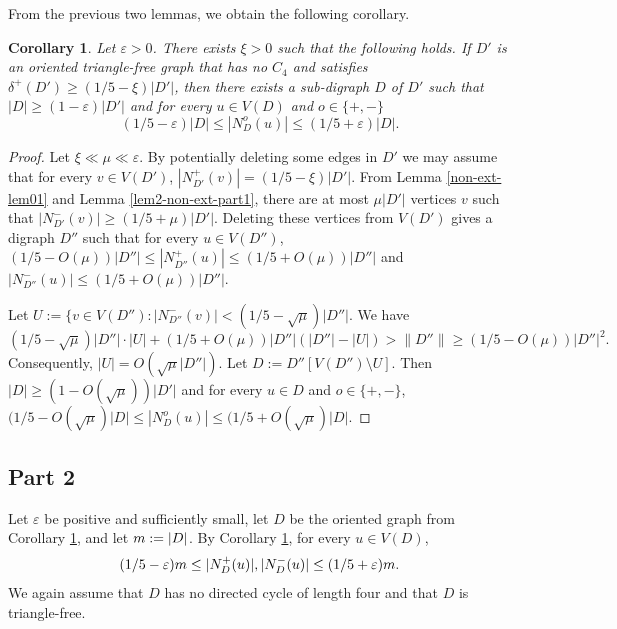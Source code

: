 \documentclass{article}
\newtheorem{cor}[theorem]{Corollary}
\renewcommand{\epsilon}{{\varepsilon}}
\DeclarePairedDelimiter{\abs}{\lvert}{\rvert}
\begin{document}
From the previous two lemmas, we obtain the following corollary.
\begin{cor}\label{cor-NE-part1}
    Let $\epsilon>0$. There exists $\xi>0$ such that the following holds. If $D'$ is an oriented triangle-free graph that has no $C_4$ and satisfies $\delta^+(D') \geq (1/5-\xi)|D'|$, then there exists a sub-digraph $D$ of $D'$ such that $|D|\geq (1-\epsilon) |D'|$ and  for every $u\in V(D)$ and $o\in \{+,-\}$ $$(1/5 - \epsilon)|D|\leq |N^o_{D}(u)| \leq (1/5+\epsilon)|D|.$$
   
\end{cor}
\begin{proof}
Let $\xi \ll \mu \ll \epsilon$. By potentially deleting some edges in $D'$ we may assume that for every $v\in V(D')$, $|N^+_{D'}(v)|= (1/5 - \xi)|D'|$. From Lemma \ref{non-ext-lem01} and Lemma \ref{lem2-non-ext-part1}, there are at most $\mu |D'|$  vertices $v$ such that $|N^-_{D'}(v)|\geq (1/5+\mu)|D'|$. Deleting these vertices from $V(D')$ gives a digraph $D''$ such that for every $u\in V(D'')$, $(1/5-O(\mu))|D''|\leq |N^+_{D''}(u)|\leq (1/5+O(\mu))|D''|$ and $|N^-_{D''}(u)|\leq (1/5+O(\mu))|D''|$.

Let $U:=\{v\in V(D'') : |N^-_{D''}(v)|<(1/5-\sqrt{\mu})|D''|$. We have
$$(1/5-\sqrt{\mu})|D''|\cdot |U| +(1/5+O(\mu))|D''|(|D''|-|U|)> \|D''\| \geq (1/5-O(\mu))|D''|^2.$$
Consequently, $|U|=O(\sqrt{\mu}|D''|)$. Let $D:=D''[V(D'')\setminus U]$. Then $|D|\geq (1-O(\sqrt{\mu}))|D'|$ and for every $u\in D$ and $o\in \{+,-\}$, $(1/5 - O(\sqrt{\mu})|D|\leq |N^o_{D}(u)| \leq (1/5+O(\sqrt{\mu})|D|.$

\end{proof}
%
% 
\subsection{Part 2}
Let $\epsilon$ be positive and sufficiently small, let $D$ be the oriented graph from Corollary \ref{cor-NE-part1}, and let $m := \abs{D}$. By Corollary \ref{cor-NE-part1}, for every $u\in V(D)$, \begin{equation}\label{eq-P2-new1}(1/5-\epsilon)m\leq \abs{N^+_D(u)}, \abs{N^-_D(u)}\leq (1/5+\epsilon)m.\end{equation}
We again assume that $D$ has no directed cycle of length four and that $D$ is triangle-free.
\end{document}

